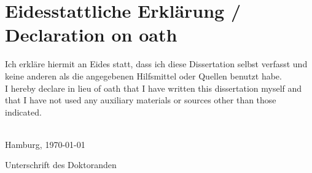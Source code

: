  
 
\vfill\vspace{-2cm}\par
\thispagestyle{empty}

\thispagestyle{empty}
\section*{Eidesstattliche Erkl\"arung / Declaration on oath}
\vspace{1cm}
\begin{center}
    
\parbox[b]{0.85\textwidth}{
  
Ich erkl\"are hiermit an Eides statt, dass ich diese Dissertation selbst verfasst und keine anderen als die angegebenen Hilfsmittel oder Quellen benutzt habe.\\

I hereby declare in lieu of oath that I have written this dissertation myself and that I have not used any auxiliary materials or sources other than those indicated.\\\\
\vspace{1cm}

\hspace{0.2cm} Hamburg, \today \hfill 
\vspace{0.5cm}

\hfill Unterschrift des Doktoranden \hspace{1.0cm} 
}

\end{center}
\vfill

\newpage
\thispagestyle{empty}
\cleardoublepage

